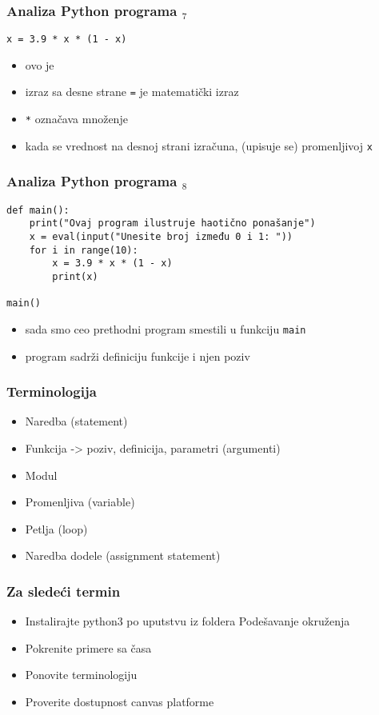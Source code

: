 \documentclass[utf8,compress,aspectratio=169]{beamer}
\begin{document}
\begin{frame}[fragile]
\frametitle{Analiza Python programa $_7$}
\begin{verbatim}
x = 3.9 * x * (1 - x)
\end{verbatim}
\begin{itemize}
  \item ovo je  
  \item izraz sa desne strane \texttt{=} je matematički izraz
  \item \texttt{*} označava množenje
  \item kada se vrednost na desnoj strani izračuna,  (upisuje se) promenljivoj \texttt{x}
\end{itemize}
\end{frame}

\begin{frame}[fragile]
\frametitle{Analiza Python programa $_8$}
\begin{verbatim}
def main():
    print("Ovaj program ilustruje haotično ponašanje")
    x = eval(input("Unesite broj između 0 i 1: "))
    for i in range(10):
        x = 3.9 * x * (1 - x)
        print(x)

main()
\end{verbatim}
\begin{itemize}
  \item sada smo ceo prethodni program smestili u funkciju \texttt{main}
  \item program sadrži definiciju funkcije i njen poziv
\end{itemize}
\end{frame}

\begin{frame}[fragile]
	\frametitle{Terminologija}
	\begin{itemize}
		\item Naredba (statement)
		\item Funkcija -> poziv, definicija, parametri (argumenti)
		\item Modul
		\item Promenljiva (variable)
		\item Petlja (loop)
		\item Naredba dodele (assignment statement)
	\end{itemize}
\end{frame}

\begin{frame}[fragile]
	\frametitle{Za sledeći termin}
	\begin{itemize}
		\item Instalirajte python3 po uputstvu iz foldera Podešavanje okruženja
		\item Pokrenite primere sa časa
		\item Ponovite terminologiju
		\item Proverite dostupnost canvas platforme
	\end{itemize}
\end{frame}
\end{document}
